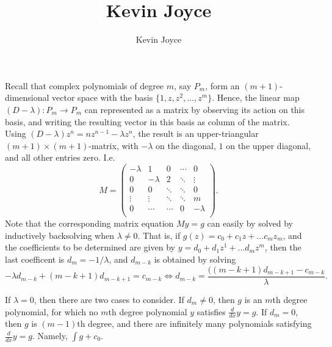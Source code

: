 \documentclass{homework}
\title{Kevin Joyce}
\author{Kevin Joyce}
\begin{document}
 
\newcommand{\figref}[1]{\figurename~\ref{#1}}
\renewcommand{\bar}{\overline}
\renewcommand{\hat}{\widehat}
\renewcommand{\SS}{\mathcal S}
\newcommand{\eps}{\varepsilon}
\newcommand{\TTheta}{\overline{\underline \Theta} }
\newcommand{\del}{\partial}
\newcommand{\approxsim}{\overset{\cdotp}{\underset{\cdotp}{\sim}}}


\begin{solution}
Recall that complex polynomials of degree $m$, say $P_m$, form an
$(m+1)$-dimensional vector space with the basis $\{1, z, z^2, \dots, z^m\}$.
Hence, the linear map $(D-\lambda):P_m \to P_m$ can represented as a matrix by
observing its action on this basis, and writing the resulting vector in this
basis as column of the matrix.  Using $(D - \lambda) z^n = n z^{n-1} - \lambda
z^n$, the result is an upper-triangular $(m+1)\times(m+1)$-matrix, with $-\lambda$ on the
diagonal, $1$ on the upper diagonal, and all other entries zero.  I.e.
$$
M = \begin{pmatrix}
-\lambda & 1	    & 0	       & \cdots & 0\\
0	 & -\lambda & 2	       & \ddots & \vdots\\
0	 & 0	    & \ddots   & \ddots & 0\\ 
\vdots   & \vdots   & \ddots   & \ddots & m\\
0	 & \cdots   & \cdots   & 0 & -\lambda\\
\end{pmatrix}.
$$
Note that the corresponding matrix equation $M y = g$ can easily by solved by
inductively backsolving when $\lambda \not= 0$.  That is, if $g(z) = c_0 + c_1
z + \dots c_m z_m$, and the coefficients to be determined are given by $y = d_0
+ d_1 z^1 + \dots d_m z^m$, then the last coefficent is $d_m = -1/\lambda$, and
$d_{m-k}$ is obtained by solving
$$
  -\lambda d_{m-k} + (m-k+1) d_{m-k+1}  = c_{m-k} \iff d_{m-k} = \frac{((m-k+1)d_{m-k+1} - c_{m-k}}{\lambda}.
$$

If $\lambda=0$, then there are two cases to consider.  If $d_m \not= 0$, then $g$ is an $m$th degree polynomial, for which no $m$th degree polynomial $y$ satisfies $\frac d{dx} y = g$.  If $d_m = 0$, then $g$ is $(m-1)$th degree, and there are infinitely many polynomials satisfying $\frac d{dx} y = g$.  Namely, $\int g + c_0$.
\end{solution}
\end{document}
